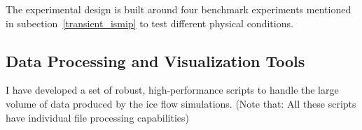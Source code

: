 The experimental design is built around four benchmark experiments mentioned in subection~\ref{transient_ismip} to test different physical conditions.















\subsection{Data Processing and Visualization Tools}\label{dataviz}

I have developed a set of robust, high-performance scripts to handle the large volume of data produced by the ice flow simulations. (Note that: All these scripts have individual file processing capabilities)

